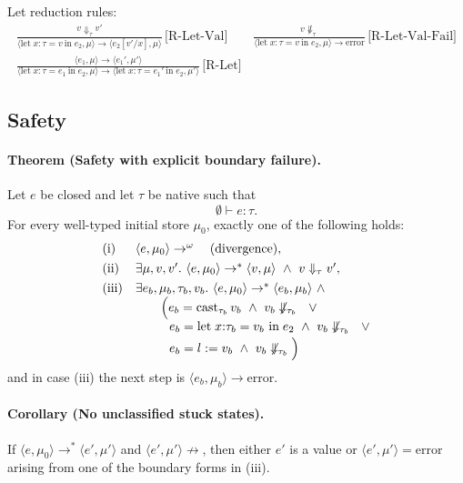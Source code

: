 \documentclass[11pt,a4paper]{article}
\begin{document}
Let reduction rules:
\begin{gather*}
  \frac{v \Downarrow_{\tau} v'}{ \langle \text{let}\; x{:}\tau = v\ \text{in}\; e_2, \mu \rangle \to \langle e_2[v'/x], \mu \rangle}\,\text{[R-Let-Val]}
  \qquad
  \frac{v \not\Downarrow_{\tau}}{ \langle \text{let}\; x{:}\tau = v\ \text{in}\; e_2, \mu \rangle \to \text{error}}\,\text{[R-Let-Val-Fail]}
  \\[0.75em]
  \frac{\langle e_1, \mu \rangle \to \langle e_1', \mu' \rangle}{\langle \text{let}\; x{:}\tau = e_1\ \text{in}\; e_2, \mu \rangle \to \langle \text{let}\; x{:}\tau = e_1'\ \text{in}\; e_2, \mu' \rangle}\,\text{[R-Let]}
\end{gather*}

\subsection{Safety}

\paragraph{Theorem (Safety with explicit boundary failure).}
Let $e$ be closed and let $\tau$ be native such that
\[
  \emptyset \vdash e : \tau .
\]
For every well-typed initial store $\mu_0$, exactly one of the following holds:
\[
\begin{array}{ll}
\textnormal{(i)} & \langle e,\mu_0\rangle \to^\omega \quad \textnormal{(divergence)}, \\[0.35em]
\textnormal{(ii)} & \exists \mu, v, v'.\ \langle e,\mu_0\rangle \to^* \langle v,\mu\rangle \ \wedge\ v \Downarrow_{\tau} v', \\[0.35em]
\textnormal{(iii)} & \exists e_b,\mu_b,\tau_b,v_b.\ \langle e,\mu_0\rangle \to^* \langle e_b,\mu_b\rangle \ \wedge \\
& \qquad\Big(
e_b = \text{cast}_{\tau_b}\,v_b \ \wedge\ v_b \not\Downarrow_{\tau_b}
\ \ \lor \\[0.2em]
& \qquad\ \ e_b = \text{let}\;x{:}\tau_b = v_b\ \text{in}\;e_2 \ \wedge\ v_b \not\Downarrow_{\tau_b}
\ \ \lor \\[0.2em]
& \qquad\ \ e_b = l \mathrel{:=} v_b \ \wedge\ v_b \not\Downarrow_{\tau_b}
\Big)
\end{array}
\]
and in case \textnormal{(iii)} the next step is $\langle e_b,\mu_b\rangle \to \text{error}$.

\paragraph{Corollary (No unclassified stuck states).}
If $\langle e,\mu_0\rangle \to^* \langle e',\mu'\rangle$ and $\langle e',\mu'\rangle \not\to$, then either $e'$ is a value or $\langle e',\mu'\rangle=\text{error}$ arising from one of the boundary forms in \textnormal{(iii)}.
\end{document}
